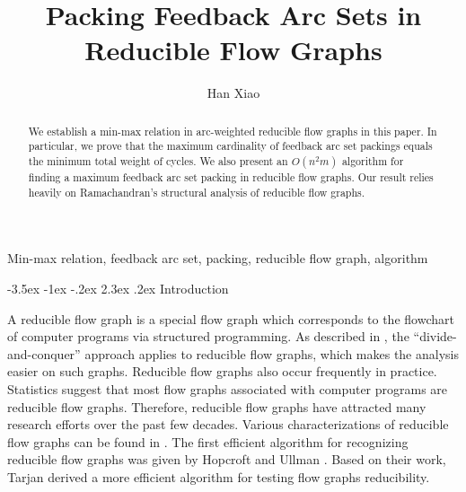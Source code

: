 \documentclass[11pt]{article}
\title{\bf Packing Feedback Arc Sets in Reducible Flow Graphs}
\author{Han Xiao}
\affil{Department of Mathematics, The University of Hong Kong,

Hong Kong, China

{\tt hxiao.math@connect.hku.hk}}
\makeatletter
\renewcommand\section{%
  \@startsection{section}{1}
                {\z@}%
                {-3.5ex \@plus -1ex \@minus -.2ex}%
                {2.3ex \@plus.2ex}%
                {\large\bfseries}%
}
\makeatother
\begin{document}
 \date{}
\maketitle

\begin{abstract}
We establish a min-max relation in arc-weighted reducible flow graphs in this paper. In particular, we prove that the maximum cardinality of feedback arc set packings equals the minimum total weight of cycles.  We also present an $O(n^2 m)$ algorithm for finding a maximum feedback arc set packing in reducible flow graphs. Our result relies heavily on Ramachandran's \cite{Rama1,Rama2} structural analysis of reducible flow graphs.
\end{abstract}

\quad Min-max relation, feedback arc set, packing, reducible flow graph, algorithm


\jot


\section{Introduction}
\label{intro}

A reducible flow graph is a special flow graph which corresponds to the flowchart of computer programs via structured programming. As described in \cite{Hech}, the ``divide-and-conquer'' approach applies to reducible flow graphs, which makes the analysis easier on such graphs. Reducible flow graphs also occur frequently in practice. Statistics suggest that most flow graphs associated with computer programs are reducible flow graphs. Therefore, reducible flow graphs have attracted many research efforts over the past few decades. Various characterizations of reducible flow graphs can be found in \cite{HecU1}. The first efficient algorithm for recognizing reducible flow graphs was given by Hopcroft and Ullman \cite{HopU}. Based on their work, Tarjan \cite{Tarj} derived a more efficient algorithm for testing flow graphs reducibility. 
\end{document}
